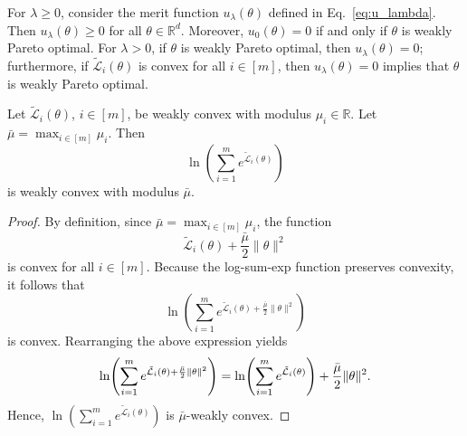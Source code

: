 \documentclass[sigconf]{acmart}
\begin{document}


\begin{lemma}
\label{lem:u_lambda_merit}
For $\lambda\ge 0$, consider the merit function $u_\lambda(\theta)$ defined in Eq.~\eqref{eq:u_lambda}. Then $u_\lambda(\theta)\ge 0$ for all $\theta\in \mathbb{R}^d$. Moreover, $u_0(\theta)=0$ if and only if $\theta$ is weakly Pareto optimal. For $\lambda>0$, if $\theta$ is weakly Pareto optimal, then $u_\lambda(\theta)=0$; furthermore, if $\tilde{\mathcal{L}}_i(\theta)$ is convex for all $i\in[m]$, then $u_\lambda(\theta)=0$ implies that $\theta$ is weakly Pareto optimal.
\end{lemma}


\begin{lemma}
\label{lem:lse_weak_convex}
Let $\tilde{\mathcal{L}}_i(\theta)$, $i\in[m]$, be weakly convex with modulus
$\mu_i\in\mathbb{R}$. Let $\bar{\mu}=\max_{i\in[m]} \mu_i$. Then
\[
\ln\!\left(\sum_{i=1}^m e^{\tilde{\mathcal{L}}_i(\theta)}\right)
\]
is weakly convex with modulus $\bar{\mu}$.
\end{lemma}
\begin{proof}
By definition, since $\bar{\mu}=\max_{i\in[m]} \mu_i$, the function
\[
\tilde{\mathcal{L}}_i(\theta)+\frac{\bar{\mu}}{2}\|\theta\|^2
\]
is convex for all $i\in[m]$.
Because the log-sum-exp function preserves convexity, it follows that
\[
\ln\!\left(
\sum_{i=1}^m
e^{\tilde{\mathcal{L}}_i(\theta)+\frac{\bar{\mu}}{2}\|\theta\|^2}
\right)
\]
is convex.
Rearranging the above expression yields
\begin{align}
\ln\!\left(
\sum_{i=1}^m
e^{\tilde{\mathcal{L}}_i(\theta)+\frac{\bar{\mu}}{2}\|\theta\|^2}
\right)
=
\ln\!\left(\sum_{i=1}^m e^{\tilde{\mathcal{L}}_i(\theta)}\right)
+
\frac{\bar{\mu}}{2}\|\theta\|^2 \notag .
\end{align}
Hence,
\(
\ln\!\left(\sum_{i=1}^m e^{\tilde{\mathcal{L}}_i(\theta)}\right)
\)
is $\bar{\mu}$-weakly convex.
\end{proof}
\end{document}
